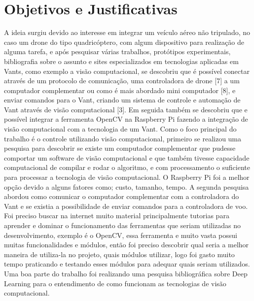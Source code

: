 \chapter{Objetivos e Justificativas}\label{cap:objJust}
A ideia surgiu devido ao interesse em integrar um veículo aéreo não tripulado, no caso um drone do tipo quadricóptero, com algum dispositivo para realização de alguma tarefa, e após pesquisar várias trabalhos, protótipos experimentais, bibliografia sobre o assunto e sites especializados em tecnologias aplicadas em Vants, como exemplo a visão computacional, se descobriu que é possível conectar através de um protocolo de comunicação, uma controladora de drone \cite{sete} [7] a um computador complementar ou como é mais abordado mini computador \cite{oito}[8], e enviar comandos para o Vant, criando um sistema de controle e automação de Vant através de visão computacional \cite{tres}[3]. Em seguida também se descobriu que e possível integrar a ferramenta OpenCV na Raspberry Pi fazendo a integração de visão computacional com a tecnologia de um Vant.
Como o foco principal do trabalho é o controle utilizando visão computacional, primeiro se realizou uma pesquisa para descobrir se existe um computador complementar que pudesse comportar um software de visão computacional e que também tivesse capacidade computacional de compilar e rodar o algoritmo, e com processamento o suficiente para processar a tecnologia de visão computacional.
O Raspberry Pi foi a melhor opção devido a alguns fatores como; custo, tamanho, tempo.
A segunda pesquisa abordou como comunicar o computador complementar com a controladora do Vant e se existia a possibilidade de enviar comandos para a controladora de voo. 
Foi preciso buscar na internet muito material principalmente tutorias para aprender e dominar o funcionamento das ferramentas que seriam utilizadas no desenvolvimento, exemplo é o OpenCV, essa ferramenta e muito vasta possui muitas funcionalidades e módulos, então foi preciso descobrir qual seria a melhor maneira de utiliza-la no projeto, quais módulos utilizar, logo foi gasto muito tempo praticando e testando esses módulos para adequar quais seriam utilizados.  
Uma boa parte do trabalho foi realizando uma pesquisa bibliográfica sobre Deep Learning para o entendimento de como funcionam as tecnologias de visão computacional.
